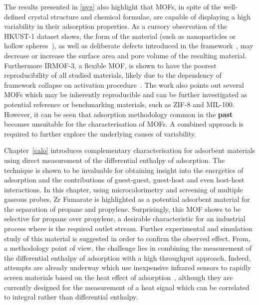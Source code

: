 The results presented in \autoref{pyg} also highlight that
\glspl{MOF}, in spite of the well-defined crystal structure and 
chemical formulae, are capable of displaying a high variability in
their adsorption properties. 
As a cursory observation of the HKUST-1 dataset shows, the form of the 
material (such as nanoparticles or hollow
spheres~\cite{liControllableSynthesisMetal2013}), as well as 
deliberate defects introduced in the 
framework~\cite{barinDefectCreationLinker2014}, may decrease or 
increase the surface area and pore volume of the resulting material.
Furthermore IRMOF-3, a flexible \gls{MOF}, 
is shown to have the poorest reproducibility of all studied materials,
likely due to the dependency of framework collapse on 
activation procedure~\cite{engelActivationDependentBreathingFlexible2017}.
The work also points out several \glspl{MOF} 
which may be inherently reproducible and can be further investigated as 
potential reference or benchmarking materials, such as 
ZIF-8 and MIL-100.
However, it can be seen that adsorption methodology common in the
\textbf{past} becomes unsuitable for the characterisation of \glspl{MOF}. 
A combined approach is required to further explore the underlying 
causes of variability.

Chapter~\ref{calo} introduces complementary characterisation 
for adsorbent materials using direct measurement of the
differential enthalpy of adsorption. The technique is shown to be 
invaluable for obtaining insight into the energetics of 
adsorption and the contributions of guest-guest, guest-host 
and even host-host interactions. In this chapter,
using microcalorimetry and screening of multiple gaseous probes,
Zr Fumarate is highlighted as a potential adsorbent material for the 
separation of propane and propylene. Surprisingly, this \gls{MOF} shows
to be selective for propane over propylene, a desirable characteristic
for an industrial process where  is the required
outlet stream. Further experimental and simulation study of this
material is suggested in order to confirm the observed effect.
From, a methodology point of view, the challenge lies in combining
the measurement of the differential enthalpy of adsorption with a 
high throughput approach. 
Indeed, attempts are already underway which use inexpensive infrared 
sensors to rapidly screen materials based on the heat effect of 
adsorption~\cite{wollmannInfrasorbOpticalDetection2012}, although
they are currently designed for the measurement of a heat signal 
which can be correlated to integral rather than differential enthalpy.

